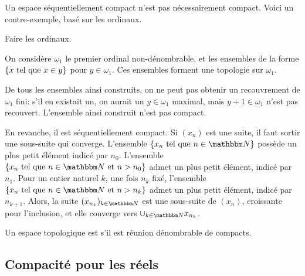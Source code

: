 \begin{remark} \label{ContreExSeqCompactNonCompact}
  Un espace séquentiellement compact n'est pas nécessairement compact. Voici un contre-exemple, basé sur les ordinaux.
  \begin{probleme}
    Faire les ordinaux.
  \end{probleme}

  On considère \( \omega_1 \) le premier ordinal non-dénombrable, et les ensembles de la forme \( \{ x \text{ tel que } x \in y \} \) pour \( y \in \omega_1\). Ces ensembles forment une topologie sur \( \omega_1 \).

De tous les ensembles ainsi construits, on ne peut pas obtenir un recouvrement de \( \omega_1 \) fini: s'il en existait un, on aurait un \( y \in \omega_1\) maximal, mais \( y+1 \in \omega_1\) n'est pas recouvert. L'ensemble ainsi construit n'est pas compact.

En revanche, il est séquentiellement compact. Si \((x_n)\) est une suite, il faut sortir une sous-suite qui converge. L'ensemble \( \{x_n \tq n \in \eN \}\) possède un plus petit élément indicé par \( n_0 \). L'ensemble \( \{x_n \tq n \in \eN \text{ et } n > n_0\}\) admet un plus petit élément, indicé par \( n_1 \). Pour un entier naturel \( k \), une fois \(n_k\) fixé, l'ensemble \( \{x_n \tq n \in \eN \text{ et } n > n_k\}\) admet un plus petit élément, indicé par \( n_{k+1} \). Alors, la suite \( (x_{n_k})_{k \in \eN} \) est une sous-suite de \( (x_n)\), croissante pour l'inclusion, et elle converge vers \( \cup_{k \in \eN} x_{n_k}\).
\end{remark}

\begin{definition}      \label{DefFCGBooLpnSAK}
    Un espace topologique est  s'il est réunion dénombrable de compacts.
\end{definition}

\subsection{Compacité pour les réels}


